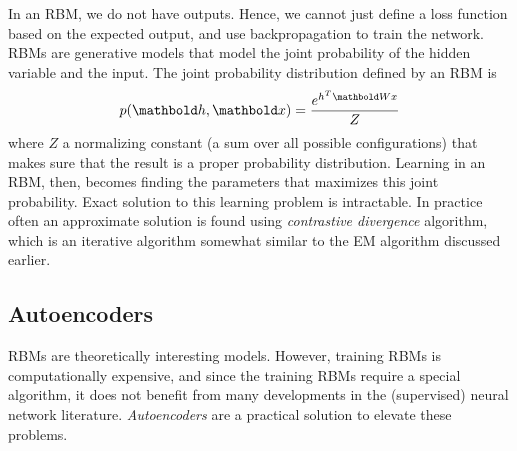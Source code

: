 In an RBM, we do not have outputs.
Hence, we cannot just define a loss function based on the expected output,
and use backpropagation to train the network.
RBMs are generative models that model the joint probability
of the hidden variable and the input.
The joint probability distribution defined by an RBM is
\begin{equation*}
  p(\vect{h}, \vect{x}) = \frac{e^{h^{T} \vect{W} x}}{Z}
\end{equation*}
where $Z$ a normalizing constant (a sum over all possible configurations)
that makes sure that the result is a proper probability distribution.
Learning in an RBM, then, becomes finding the parameters that
maximizes this joint probability.
Exact solution to this learning problem is intractable.
In practice often an approximate solution is found using
\emph{contrastive divergence} algorithm,
which is an iterative algorithm somewhat similar to the EM algorithm
discussed earlier.

\subsection{Autoencoders}

RBMs are theoretically interesting models.
However, training RBMs is computationally expensive,
and since the training RBMs require a special algorithm,
it does not benefit from many developments in the
(supervised) neural network literature.
\emph{Autoencoders} are a practical solution to elevate these problems.

